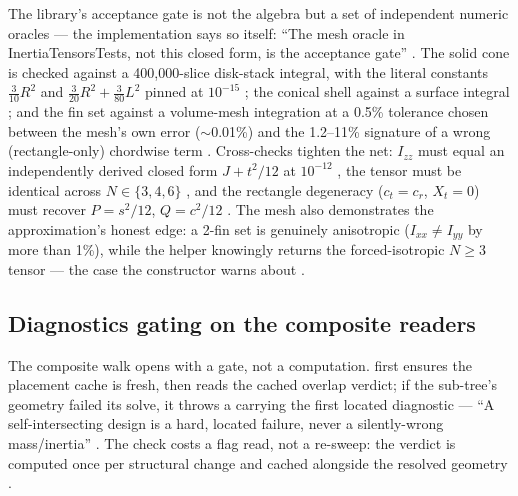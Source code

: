 The library's acceptance gate is not the algebra but a set of independent numeric oracles ---
the implementation says so itself: ``The mesh oracle in InertiaTensorsTests, not this closed
form, is the acceptance gate'' . The solid cone is checked
against a 400{,}000-slice disk-stack integral, with the literal constants $\tfrac{3}{10}R^2$
and $\tfrac{3}{20}R^2 + \tfrac{3}{80}L^2$ pinned at $10^{-15}$
; the conical shell against a surface integral
; and the fin set against a volume-mesh
integration at a 0.5\% tolerance chosen between the mesh's own error ($\sim$0.01\%) and the
1.2--11\% signature of a wrong (rectangle-only) chordwise term
. Cross-checks tighten the net: $I_{zz}$ must
equal an independently derived closed form $J + t^2/12$ at $10^{-12}$
, the tensor must be identical across
$N \in \{3, 4, 6\}$ , and the rectangle
degeneracy ($c_t = c_r$, $X_t = 0$) must recover $P = s^2/12$, $Q = c^2/12$
. The mesh also demonstrates the approximation's honest
edge: a 2-fin set is genuinely anisotropic ($I_{xx} \ne I_{yy}$ by more than 1\%), while the
helper knowingly returns the forced-isotropic $N \ge 3$ tensor --- the case the 
constructor warns about .

\subsection{Diagnostics gating on the composite readers}\label{sec:parts-gating}

The composite walk opens with a gate, not a computation.  first
ensures the placement cache is fresh, then reads the cached overlap verdict; if the sub-tree's
geometry failed its solve, it throws a  carrying the first located
diagnostic --- ``A self-intersecting design is a hard, located failure, never a
silently-wrong mass/inertia'' . The check costs a flag read,
not a re-sweep: the verdict is computed once per structural change and cached alongside the
resolved geometry .

